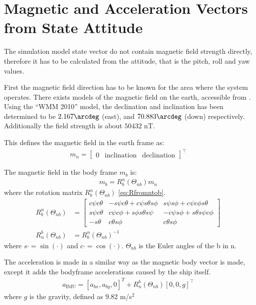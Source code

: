 \section{Magnetic and Acceleration Vectors from State Attitude}
The simulation model state vector do not contain magnetic field
strength directly, therefore it has to be calculated from the
attitude, that is the pitch, roll and yaw values.

First the magnetic field direction has to be known for the area where the system operates. There exists models of the magnetic field on the earth, accessible from \citep{geomag}. Using the ``WMM 2010'' model, the declination and inclination has been determined to be $2.167 \arcdeg$ (east), and $70.883 \arcdeg$ (down) respectively. Additionally the field strength is about $50432$ nT.

This defines the magnetic field in the earth frame as:
\begin{align}
m_n = \begin{bmatrix}0 & \text{inclination} & \text{declination}\end{bmatrix}^\top
\end{align}

The magnetic field in the body frame $m_b$ is:
\begin{align}
m_b = R_b^n(\Theta_{nb}) m_n 
\end{align}
where the rotation matrix $R_b^n(\Theta_{nb})$ \vref{eq:Rfromntob}.
\begin{align}
R_b^n (\Theta_{nb}) &=
\begin{bmatrix}
c\psi c\theta & -s\psi c\theta + c\psi s\theta s\phi & s\psi s\phi + c\psi c\phi s\theta \\
s\psi c\theta & c\psi c\phi + s\phi s\theta s\psi & -c\psi s\phi + s\theta s\psi c\phi \\
-s\theta & c\theta s\phi & c\theta s\phi
\end{bmatrix}
\label{eq:Rfrombton} \\
R_n^b (\Theta_{nb}) &= R_b^n (\Theta_{nb})^{-1}
\label{eq:Rfromntob}
\end{align}
where $s \cdot = \sin(\cdot)$ and $c \cdot = \cos(\cdot)$. $\Theta_{nb}$ is the Euler angles of the {b} in {n}.

The acceleration is made in a similar way as the magnetic body vector is made, except it adds the bodyframe accelerations caused by the ship itself.
\begin{align}
a_\text{IMU} = [a_{bx}, a_{by}, 0]^T + R_n^b (\Theta_{nb}) [0,0,g]^\top
\label{eq:accl_IMU_construction}
\end{align}
where $g$ is the gravity, defined as 9.82 m/s$^2$

